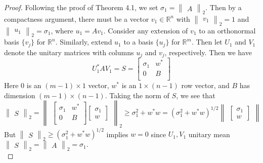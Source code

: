 \documentclass{article}
\begin{document}
\begin{proof}
    Following the proof of Theorem 4.1, we set $\sigma_1 = \begin{Vmatrix}
        A
    \end{Vmatrix}_2$. Then by a compactness argument, there must be a vector $v_1 \in \mathbb{R}^n$ with $\begin{Vmatrix}
        v_1
    \end{Vmatrix}_2 = 1$ and $\begin{Vmatrix}
        u_1
    \end{Vmatrix}_2 = \sigma_1$, where $u_1 = Av_1$. Consider any extension of $v_1$ to an orthonormal basis $\{v_j\}$ for $\mathbb{R}^n$. Similarly, extend $u_1$ to a basis $\{u_j\}$ for $\mathbb{R}^m$. Then let $U_1$ and $V_1$ denote the unitary matrices with columns $u_j$ and $v_j$, respectively. Then we have 
    \[
    U_1^* A V_1 = S = 
    \begin{bmatrix}
        \sigma_1 & w^*\\
        0 & B\\
    \end{bmatrix}    
    \]
    Here $0$ is an $(m-1) \times 1$ vector, $w^*$ is an $1 \times (n-1) $ row vector, and $B$ has dimension $(m-1) \times (n-1)$. Taking the norm of $S$, we see that
    \[
        \begin{Vmatrix}
            S
        \end{Vmatrix}_2    
        =
        \begin{Vmatrix}
            \begin{bmatrix}
                \sigma_1 & w^*\\
                0 & B\\
            \end{bmatrix}
            \begin{bmatrix}
                \sigma_1\\
                w
            \end{bmatrix}
        \end{Vmatrix}_2
        \geq
        \sigma_1^2 + w^*w
        = 
        (\sigma_1^2 + w^*w)^{1/2}\begin{Vmatrix}
            \begin{bmatrix}
                \sigma_1\\
                w
            \end{bmatrix}
        \end{Vmatrix}
    \]
But $\begin{Vmatrix}
    S
\end{Vmatrix}_2 \geq (\sigma_1^2 + w^*w)^{1/2}$ implies $w = 0$ since $U_1, V_1$ unitary mean $\begin{Vmatrix}
    S
\end{Vmatrix}_2 = \begin{Vmatrix}
    A
\end{Vmatrix}_2 = \sigma_1.$\\


\end{proof}
\end{document}
